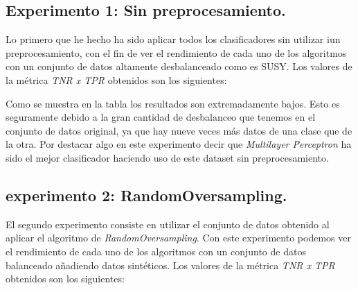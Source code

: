 \documentclass[11pt]{article}
\begin{document}
\subsection{Experimento 1: Sin preprocesamiento.}

Lo primero que he hecho ha sido aplicar todos los clasificadores sin utilizar iun preprocesamiento, con el fin de ver el rendimiento de cada uno de los algoritmos con un conjunto de datos altamente desbalanceado como es SUSY. Los valores de la métrica \textit{TNR x TPR} obtenidos son los siguientes:


\begin{table}[H]
	\centering
\end{table}

Como se muestra en la tabla los resultados son extremadamente bajos. Esto es seguramente debido a la gran cantidad de desbalanceo que tenemos en el conjunto de datos original, ya que hay nueve veces más datos de una clase que de la otra. Por destacar algo en este experimento decir que \textit{Multilayer Perceptron} ha sido el mejor clasificador haciendo uso de este dataset sin preprocesamiento.



\subsection{experimento 2: RandomOversampling.}

El segundo experimento consiste en utilizar el conjunto de datos obtenido al aplicar el algoritmo de \textit{RandomOversampling}. Con este experimento podemos ver el rendimiento de cada uno de los algoritmos con un conjunto de datos balanceado añadiendo datos sintéticos. Los valores de la métrica \textit{TNR x TPR} obtenidos son los siguientes:
\end{document}

